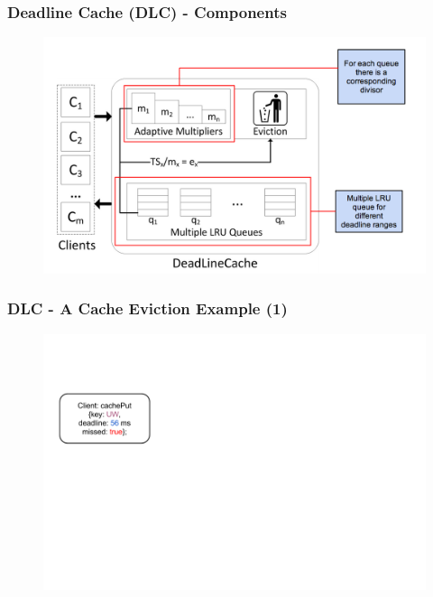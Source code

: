 \documentclass{beamer}
\begin{document}
\begin{frame}
  \frametitle{Deadline Cache (DLC) - Components}
  \begin{figure}
    \begin{center}
      \centerline{\includegraphics[scale=0.33]{img/DLC_ARC_2.png}}
    \end{center}
  \end{figure}
\end{frame}



\begin{frame}
  \frametitle{DLC - A Cache Eviction Example (1)}
  \begin{figure}
    \begin{center}
      \centerline{\includegraphics[scale=0.33]{img/DLC_V6_1.png}}
    \end{center}
  \end{figure}
\end{frame}
\end{document}

